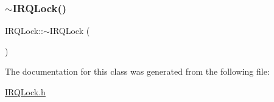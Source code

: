 \subsubsection{\texorpdfstring{$\sim$\+I\+R\+Q\+Lock()}{~IRQLock()}}
{\footnotesize\ttfamily I\+R\+Q\+Lock\+::$\sim$\+I\+R\+Q\+Lock (\begin{DoxyParamCaption}{ }\end{DoxyParamCaption})\hspace{0.3cm}{\ttfamily [inline]}}



The documentation for this class was generated from the following file\+:\begin{DoxyCompactItemize}
\item 
\hyperlink{_i_r_q_lock_8h}{I\+R\+Q\+Lock.\+h}\end{DoxyCompactItemize}
